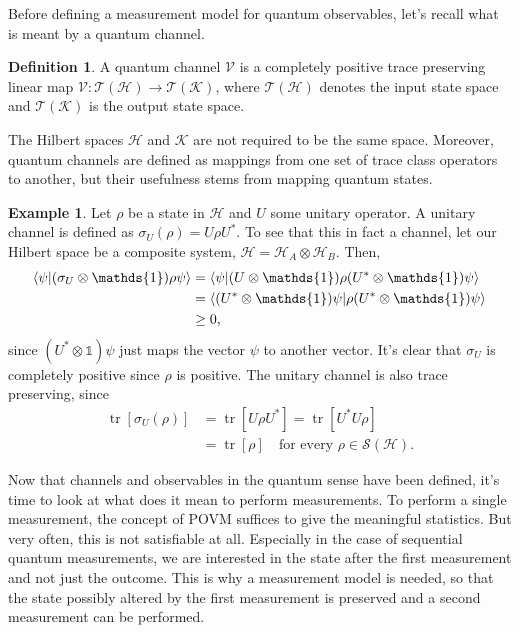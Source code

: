 \documentclass[a4paper,12pt]{wihuri}
\theoremstyle{definition}
\newtheorem{definition}{Definition}
\newtheorem{example}{Example}
\numberwithin{definition}{section}
\numberwithin{example}{section}
\numberwithin{theorem}{section}
\numberwithin{proposition}{section}
\numberwithin{lemma}{section}
\newcommand{\hi}{\mathcal{H}}%
\newcommand{\ki}{\mathcal{K}}%
\newcommand{\tc}{\mathcal{T}}%
\newcommand{\tila}{\mathcal{S}}%
\newcommand{\V}{\mathcal{V}}%
\newcommand{\id}{\mathds{1}}
\DeclareMathOperator{\tr}{tr}
\begin{document}
Before defining a measurement model for quantum observables, let's recall what is meant by a quantum channel. 
\begin{definition}
A quantum channel $\V$ is a completely positive trace preserving linear map $\V : \tc(\hi) \rightarrow \tc(\ki)$, where $\tc(\hi)$ denotes the input state space and $\tc(\ki)$ is the output state space.
\end{definition}
The Hilbert spaces $\hi$ and $\ki$ are not required to be the same space. Moreover, quantum channels are defined as mappings from one set of trace class operators to another, but their usefulness stems from mapping quantum states.
\begin{example}
Let $\rho$ be a state in $\hi$ and $U$ some unitary operator. A unitary channel is defined as $\sigma_U(\rho) = U\rho U^*$. To see that this in fact a channel, let our Hilbert space be a composite system, $\hi = \hi_A \otimes \hi_B$. Then,
\begin{align*}
\braket{\psi|(\sigma_U \otimes \id)\rho\psi} &= \braket{\psi | (U\otimes \id)\rho(U^*\otimes \id)\psi}\\
&=\braket{(U^*\otimes \id)\psi |\rho(U^*\otimes \id)\psi}\\
&\geq 0,
\end{align*}
since $(U^*\otimes \id)\psi$ just maps the vector $\psi$ to another vector. It's clear that $\sigma_U$ is completely positive since $\rho$ is positive. The unitary channel is also trace preserving, since 
\begin{align*}
\tr[\sigma_U(\rho)] &= \tr[U\rho U^*]=\tr[U^*U\rho]\\
&= \tr[\rho]\quad \text{for every } \rho \in \tila(\hi).
\end{align*}
\end{example}




Now that channels and observables in the quantum sense have been defined, it's time to look at what does it mean to perform measurements. To perform a single measurement, the concept of POVM suffices to give the meaningful statistics. But very often, this is not satisfiable at all. Especially in the case of sequential quantum measurements, we are interested in the state after the first measurement and not just the outcome. This is why a measurement model is needed, so that the state possibly altered by the first measurement is preserved and a second measurement can be performed.
\end{document}
